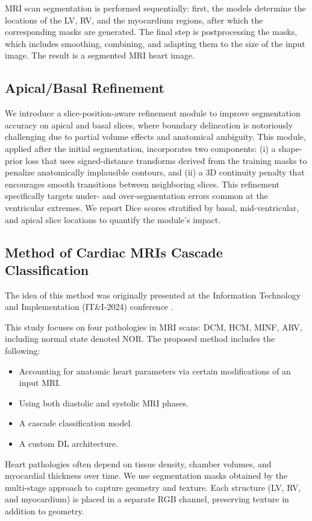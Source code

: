 \documentclass[fleqn,10pt]{wlscirep}
\begin{document}
MRI scan segmentation is performed sequentially: first, the models determine the locations of the LV, RV, and the myocardium regions, after which the corresponding masks are generated. The final step is postprocessing the masks, which includes smoothing, combining, and adapting them to the size of the input image. The result is a segmented MRI heart image.

\subsection*{Apical/Basal Refinement}
We introduce a slice-position-aware refinement module to improve segmentation accuracy on apical and basal slices, where boundary delineation is notoriously challenging due to partial volume effects and anatomical ambiguity. This module, applied after the initial segmentation, incorporates two components: (i) a shape-prior loss that uses signed-distance transforms derived from the training masks to penalize anatomically implausible contours, and (ii) a 3D continuity penalty that encourages smooth transitions between neighboring slices. This refinement specifically targets under- and over-segmentation errors common at the ventricular extremes. We report Dice scores stratified by basal, mid-ventricular, and apical slice locations to quantify the module's impact.

\subsection*{Method of Cardiac MRIs Cascade Classification}

The idea of this method was originally presented at the Information Technology and Implementation (IT\&I-2024) conference \cite{Slobodzian:2025}.

This study focuses on four pathologies in MRI scans: DCM, HCM, MINF, ARV, including normal state denoted NOR. The proposed method includes the following:

\begin{itemize}
    \item Accounting for anatomic heart parameters via certain modifications of an input MRI.
    \item Using both diastolic and systolic MRI phases.
    \item A cascade classification model.
    \item A custom DL architecture.
\end{itemize}

Heart pathologies often depend on tissue density, chamber volumes, and myocardial thickness over time. We use segmentation masks obtained by the multi-stage approach to capture geometry and texture. Each structure (LV, RV, and myocardium) is placed in a separate RGB channel, preserving texture in addition to geometry.
\end{document}
